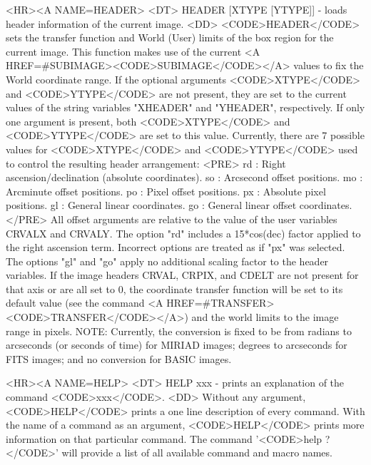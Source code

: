 \begin{rawhtml}
<HR><A NAME=HEADER>
<DT>
HEADER [XTYPE [YTYPE]] - loads header information of the current image.
<DD>
	<CODE>HEADER</CODE> sets the transfer function and World (User)
	limits of the box region for the current image.  This function
	makes use of the current <A HREF=#SUBIMAGE><CODE>SUBIMAGE</CODE></A>
	values to fix the World coordinate range.  If the optional
	arguments <CODE>XTYPE</CODE> and <CODE>YTYPE</CODE> are
	not present, they are set to the current values of the string
	variables "XHEADER" and "YHEADER", respectively.  If only one
	argument is present, both <CODE>XTYPE</CODE> and <CODE>YTYPE</CODE>
	are set to this value.  Currently, there are 7 possible values
	for <CODE>XTYPE</CODE> and <CODE>YTYPE</CODE> used to control
	the resulting header arrangement:
	<PRE>
    rd : Right ascension/declination (absolute coordinates).
    so : Arcsecond offset positions.
    mo : Arcminute offset positions.
    po : Pixel offset positions.
    px : Absolute pixel positions.
    gl : General linear coordinates.
    go : General linear offset coordinates.
	</PRE>
	All offset arguments are relative to the value of the user variables
	CRVALX and CRVALY.  The option "rd" includes a 15*cos(dec) factor
	applied to the right ascension term.  Incorrect options are treated
	as if "px" was selected.  The options "gl" and "go" apply no
	additional scaling factor to the header variables.  If the image
	headers CRVAL, CRPIX, and CDELT are not present for that axis or
	are all set to 0, the coordinate transfer function will be set to
	its default value (see the command
	<A HREF=#TRANSFER><CODE>TRANSFER</CODE></A>) and the world limits
	to the image range in pixels.
	NOTE: Currently, the conversion is
	fixed to be from radians to arcseconds (or seconds of time) for
	MIRIAD images; degrees to arcseconds for FITS images; and no
	conversion for BASIC images.

<HR><A NAME=HELP>
<DT>
HELP xxx - prints an explanation of the command <CODE>xxx</CODE>.
<DD>
	Without any argument, <CODE>HELP</CODE> prints a one line
	description of every command.  With the name of a command as
	an argument, <CODE>HELP</CODE> prints more information on that
	particular command.  The command '<CODE>help ?</CODE>' will
	provide a list of all available command and macro names.


\end{rawhtml}
